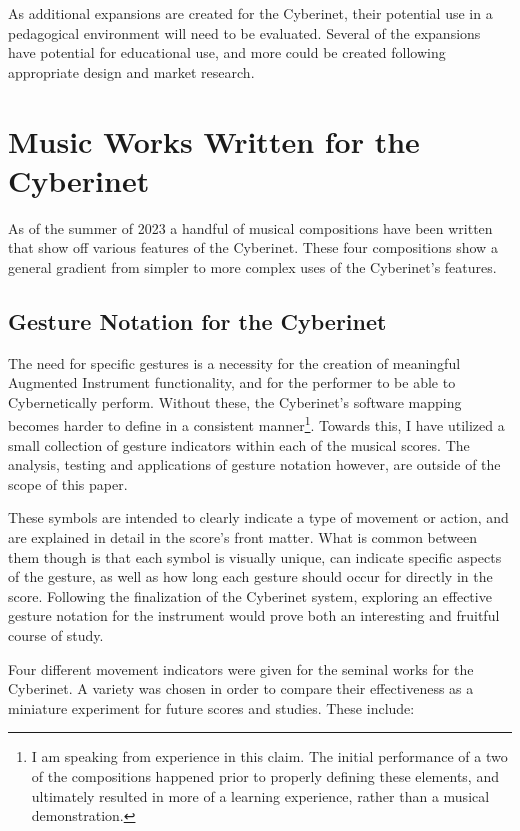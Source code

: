 As additional expansions are created for the Cyberinet, their potential use in a pedagogical environment will need to be evaluated. Several of the expansions have potential for educational use, and more could be created following appropriate design and market research.

\chapter{Music Works Written for the Cyberinet}
As of the summer of 2023 a handful of musical compositions have been written that show off various features of the Cyberinet. These four compositions show a general gradient from simpler to more complex uses of the Cyberinet’s features.

\section{Gesture Notation for the Cyberinet}

The need for specific gestures is a necessity for the creation of meaningful Augmented Instrument functionality, and for the performer to be able to Cybernetically perform. Without these, the Cyberinet's software mapping becomes harder to define in a consistent manner\footnote{I am speaking from experience in this claim. The initial performance of a two of the compositions happened prior to properly defining these elements, and ultimately resulted in more of a learning experience, rather than a musical demonstration.}. Towards this, I have utilized a small collection of gesture indicators within each of the musical scores. The analysis, testing and applications of gesture notation however, are outside of the scope of this paper.

These symbols are intended to clearly indicate a type of movement or action, and are explained in detail in the score's front matter. What is common between them though is that each symbol is visually unique, can indicate specific aspects of the gesture, as well as how long each gesture should occur for directly in the score. Following the finalization of the Cyberinet system, exploring an effective gesture notation for the instrument would prove both an interesting and fruitful course of study. 

Four different movement indicators were given for the seminal works for the Cyberinet. A variety was chosen in order to compare their effectiveness as a miniature experiment for future scores and studies. These include: 


